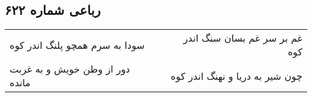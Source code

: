 \begin{center}
\section*{رباعی شماره ۶۲۲}
\label{sec:sh622}
\begin{longtable}{l p{0.5cm} r}
سودا به سرم همچو پلنگ اندر کوه
&&
غم بر سر غم بسان سنگ اندر کوه
\\
دور از وطن خویش و به غربت مانده
&&
چون شیر به دریا و نهنگ اندر کوه
\\
\end{longtable}
\end{center}
